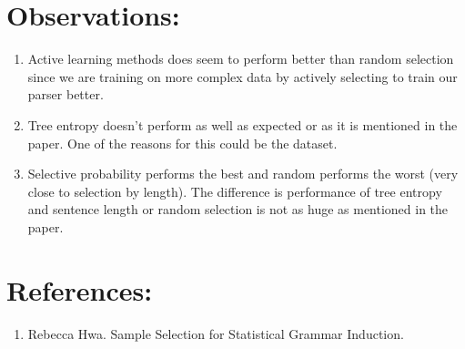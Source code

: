 \documentclass[10pt] {article}
\begin{document}


\section{Observations:}

\begin{enumerate}
\item Active learning methods does seem to perform better than random selection since we are training on more complex data by actively selecting to train our parser better.
\item Tree entropy doesn't perform as well as expected or as it is mentioned in the paper. One of the reasons for this could be the dataset. 
\item Selective probability performs the best and random performs the worst (very close to selection by length). The difference is performance of tree entropy and sentence length or random selection is not as huge as mentioned in the paper.
\end{enumerate}




\section{References:}
\begin{enumerate}
\item Rebecca Hwa. Sample Selection for Statistical Grammar Induction. 
\end{enumerate}

\end{document}
